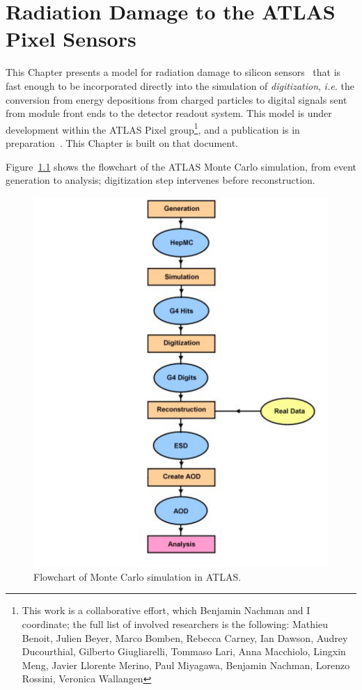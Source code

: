 \chapter{Radiation Damage to the ATLAS Pixel Sensors}
\label{chap:digi}

This Chapter presents a model for radiation damage to silicon sensors~\cite{Benoit:2255825,DigiIFAE} that is fast enough to be incorporated directly into the simulation of \textit{digitization}, {\it i.e.} the conversion from energy depositions from charged particles to digital signals sent from module front ends to the detector readout system.  This model is under development within the ATLAS Pixel 
group\footnote{This work is a collaborative effort, which Benjamin Nachman and I coordinate;  the full list of involved researchers is the following: Mathieu Benoit, Julien Beyer, Marco Bomben, Rebecca Carney, Ian Dawson, Audrey Ducourthial, Gilberto Giugliarelli, Tommaso Lari, Anna Macchiolo, Lingxin Meng, Javier Llorente Merino, Paul Miyagawa, Benjamin Nachman, Lorenzo Rossini, Veronica Wallangen}, and a publication is in preparation~\cite{Benoit:2255825}. 
This Chapter is built on that document.


\noindent Figure~\ref{fig:atlassim} shows the flowchart of the ATLAS Monte Carlo simulation, from 
event generation to analysis; digitization step intervenes before reconstruction.


\begin{figure}[!htpb]
\centering
\includegraphics[height=0.35\textheight]{newatlassim.pdf}
\caption{\label{fig:atlassim}Flowchart of Monte Carlo simulation in ATLAS.}
\end{figure}

